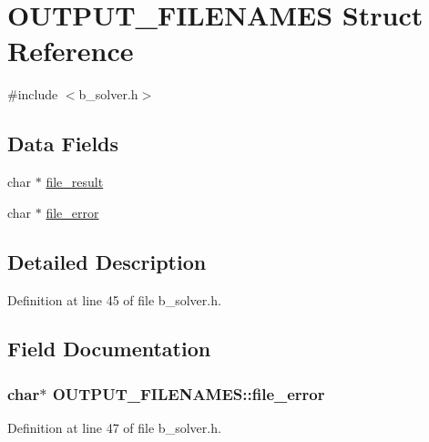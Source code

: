 \hypertarget{struct_o_u_t_p_u_t___f_i_l_e_n_a_m_e_s}{\section{O\-U\-T\-P\-U\-T\-\_\-\-F\-I\-L\-E\-N\-A\-M\-E\-S Struct Reference}
\label{struct_o_u_t_p_u_t___f_i_l_e_n_a_m_e_s}
}


{\ttfamily \#include $<$b\-\_\-solver.\-h$>$}

\subsection*{Data Fields}
\begin{DoxyCompactItemize}
\item 
char $\ast$ \hyperlink{struct_o_u_t_p_u_t___f_i_l_e_n_a_m_e_s_ae980a071a2f3e304d192ef8263a1e4a0}{file\-\_\-result}
\item 
char $\ast$ \hyperlink{struct_o_u_t_p_u_t___f_i_l_e_n_a_m_e_s_a6854202b8b997d9181555d339737364e}{file\-\_\-error}
\end{DoxyCompactItemize}


\subsection{Detailed Description}


Definition at line 45 of file b\-\_\-solver.\-h.



\subsection{Field Documentation}
\hypertarget{struct_o_u_t_p_u_t___f_i_l_e_n_a_m_e_s_a6854202b8b997d9181555d339737364e}{
\subsubsection[{file\-\_\-error}]{\setlength{\rightskip}{0pt plus 5cm}char$\ast$ O\-U\-T\-P\-U\-T\-\_\-\-F\-I\-L\-E\-N\-A\-M\-E\-S\-::file\-\_\-error}}\label{struct_o_u_t_p_u_t___f_i_l_e_n_a_m_e_s_a6854202b8b997d9181555d339737364e}


Definition at line 47 of file b\-\_\-solver.\-h.



